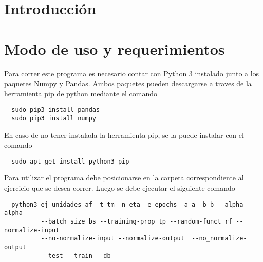 \section{Introducción}


\section{Modo de uso y requerimientos}
Para correr este programa es necesario contar con Python 3 instalado junto a los paquetes Numpy y Pandas. Ambos paquetes pueden descargarse a traves
de la herramienta pip de python mediante el comando
\begin{verbatim}
  sudo pip3 install pandas
  sudo pip3 install numpy
\end{verbatim}
En caso de no tener instalada la herramienta pip, se la puede instalar con el comando
\begin{verbatim}
  sudo apt-get install python3-pip
\end{verbatim}

Para utilizar el programa debe posicionarse en la carpeta correspondiente al ejercicio que se desea correr. Luego se debe ejecutar el siguiente comando
\begin{verbatim}
  python3 ej unidades af -t tm -n eta -e epochs -a a -b b --alpha alpha
          --batch_size bs --training-prop tp --random-funct rf --normalize-input
          --no-normalize-input --normalize-output  --no_normalize-output
          --test --train --db
\end{verbatim}

